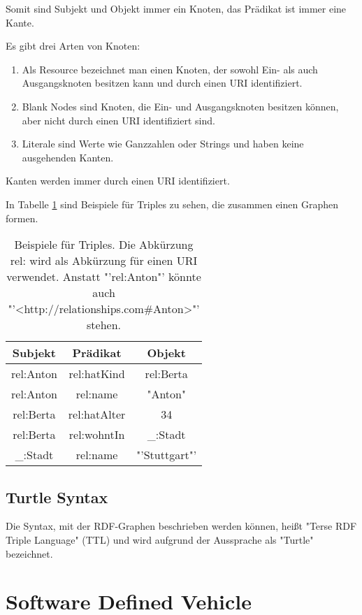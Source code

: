 Somit sind Subjekt und Objekt immer ein Knoten, das Prädikat ist immer eine Kante.

Es gibt drei Arten von Knoten:
\begin{enumerate}
	\item Als Resource bezeichnet man einen Knoten, der sowohl Ein- als auch Ausgangsknoten besitzen kann und durch einen URI identifiziert.
	\item Blank Nodes sind Knoten, die Ein- und Ausgangsknoten besitzen können, aber nicht durch einen URI identifiziert sind.
	\item Literale sind Werte wie Ganzzahlen oder Strings und haben keine ausgehenden Kanten.	
\end{enumerate}
Kanten werden immer durch einen URI identifiziert.

In Tabelle \ref{tab:triples} sind Beispiele für Triples zu sehen, die zusammen einen Graphen formen. 

\begin{table}
	\centering
	\begin{tabular}{c|c|c}
		Subjekt & Prädikat & Objekt \\ \hline
		rel:Anton & rel:hatKind & rel:Berta \\
		rel:Anton & rel:name & "Anton" \\
		rel:Berta & rel:hatAlter & 34 \\
		rel:Berta & rel:wohntIn & \_:Stadt \\
		\_:Stadt & rel:name & "'Stuttgart"' \\
	\end{tabular}
	\label{tab:triples}
	\caption[Beispiele für Triples]{Beispiele für Triples. Die Abkürzung rel: wird als Abkürzung für einen URI verwendet. Anstatt "'rel:Anton"' könnte auch "'\textless http://relationships.com\#Anton\textgreater"' stehen.}
\end{table}



\subsection{Turtle Syntax}


Die Syntax, mit der RDF-Graphen beschrieben werden können, heißt "Terse RDF Triple Language" (TTL) und wird aufgrund der Aussprache als "Turtle" bezeichnet. \cite[vgl.][]{w3c2014turtle}


\section{Software Defined Vehicle}

